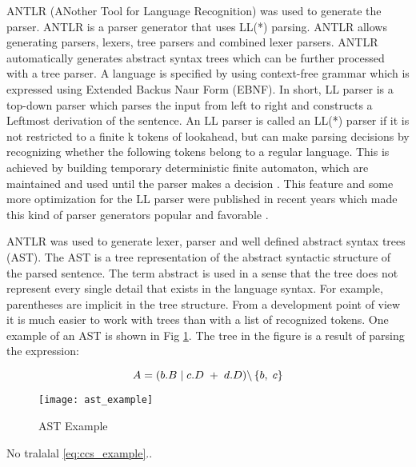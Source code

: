 ANTLR (ANother Tool for Language Recognition) was used to generate the parser. ANTLR is a 
parser generator that uses LL(*) parsing. ANTLR allows generating parsers, lexers, tree 
parsers and combined lexer parsers. ANTLR automatically generates abstract syntax trees
which can be further processed with a tree parser. A language is specified by using context-free
grammar which is expressed using Extended Backus Naur Form (EBNF). In short, LL parser is a 
top-down parser which parses the input from left to right and constructs a Leftmost derivation 
of the sentence. An LL parser is called an LL(*) parser if it is not restricted to a finite k 
tokens of lookahead, but can make parsing decisions by recognizing whether the following tokens
belong to a regular language. This is achieved by building temporary deterministic finite
automaton, which are maintained and used until the parser makes a decision \cite{ANTLRRef}. This feature and
some more optimization for the LL parser were published in recent years which made this kind 
of parser generators popular and favorable \cite{NiklausWirth}.

ANTLR was used to generate lexer, parser and well defined abstract syntax trees (AST). The AST
is a tree representation of the abstract syntactic structure of the parsed sentence. The term
abstract is used in a sense that the tree does not represent every single detail that exists 
in the language syntax. For example, parentheses are implicit in the tree structure. From a 
development point of view it is much easier to work with trees than with a list of recognized
tokens. One example of an AST is shown in  Fig \ref{fig:ast_example}. The tree in the figure 
is a result of parsing the expression: 

\begin{equation}\label{eq:ccs_example}
 A=( b.B \hspace{1 mm} | \hspace{1 mm} c.D \hspace{1 mm} + \hspace{1 mm} d.D )
\backslash \left\lbrace b, \hspace{1 mm} c \right\rbrace 
\end{equation}

\begin{figure}[!t]
\centering
\texttt{[image: ast\_example]}
\caption{AST Example}
\label{fig:ast_example}
\end{figure}

No tralalal \ref{eq:ccs_example}..
